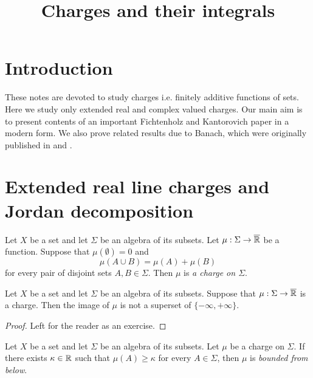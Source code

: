 



\title{Charges and their integrals}
\date{}
\maketitle

\section{Introduction}
\noindent
These notes are devoted to study charges i.e. finitely additive functions of sets. Here we study only extended real and complex valued charges. Our main aim is to present contents of an important Fichtenholz and Kantorovich paper \cite{fichtenholz1934operations} in a modern form. We also prove related results due to Banach, which were originally published in \cite{banach1923problemelameasure} and \cite{banach1979theorieoperationslineaires}.

\section{Extended real line charges and Jordan decomposition}

\begin{definition}
    Let $X$ be a set and let $\Sigma$ be an algebra of its subsets. Let $\mu:\Sigma \rightarrow \overline{{\mathbb R}}$ be a function. Suppose that $\mu(\emptyset) = 0$ and
    $$\mu(A \cup B) = \mu(A) + \mu(B)$$
    for every pair of disjoint sets $A,B \in \Sigma$. Then $\mu$ is \textit{a charge on $\Sigma$}.
\end{definition}

\begin{fact}\label{fact:one_side_infinity_only_for_finitely_additive}
    Let $X$ be a set and let $\Sigma$ be an algebra of its subsets. Suppose that $\mu:\Sigma \rightarrow \overline{{\mathbb R}}$ is a charge. Then the image of $\mu$ is not a superset of $\{-\infty,+\infty\}$.
\end{fact}
\begin{proof}
    Left for the reader as an exercise.
\end{proof}

\begin{definition}
    Let $X$ be a set and let $\Sigma$ be an algebra of its subsets. Let $\mu$ be a charge on $\Sigma$. If there exists $\kappa \in {\mathbb R}$ such that $\mu(A) \geq
        \kappa$ for every $A \in \Sigma$, then $\mu$ is \textit{bounded from below}.
\end{definition}


